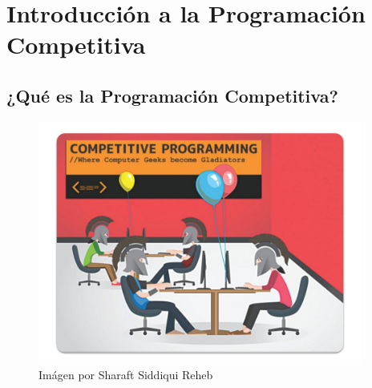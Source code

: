 \documentclass[12pt, fleqn]{report}                             %
\theoremstyle{break}                                            %
\begin{document}
\restoregeometry                                                    %
\nopagecolor                                                        %


\tableofcontents{}
\label{sec:Index}
\clearpage



\part{Introducción a la Programación Competitiva}

    \clearpage
    \chapter{¿Qué es la Programación Competitiva?}

        \begin{figure}[h]
            \includegraphics[width=0.95\textwidth]{CpIntro}
            \caption{Imágen por Sharaft Siddiqui Reheb}
        \end{figure}
    
\end{document}
